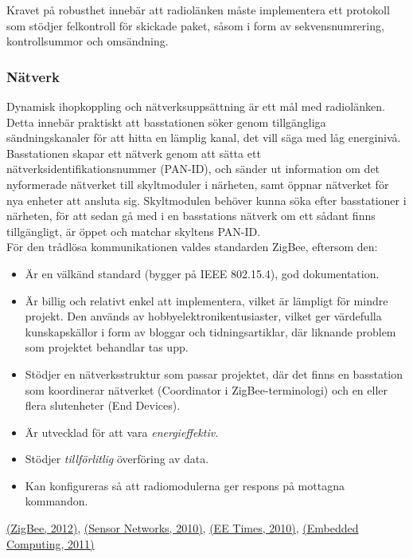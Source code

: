 \documentclass[a4paper,11pt]{article}
\begin{document}
Kravet på robusthet innebär att radiolänken måste implementera ett protokoll som stödjer felkontroll för skickade paket, såsom i form av sekvensnumrering, kontrollsummor och omsändning.

\subsubsection{Nätverk}
Dynamisk ihopkoppling och nätverksuppsättning är ett mål med radiolänken. Detta innebär praktiskt att basstationen söker genom tillgängliga sändningskanaler för att hitta en lämplig kanal, det vill säga med låg energinivå. Basstationen skapar ett nätverk genom att sätta ett nätverksidentifikationsnummer (PAN-ID), och sänder ut information om det nyformerade nätverket till skyltmoduler i närheten, samt öppnar nätverket för nya enheter att ansluta sig. Skyltmodulen behöver kunna söka efter basstationer i närheten, för att sedan gå med i en basstations nätverk om ett sådant finns tillgängligt, är öppet och matchar skyltens PAN-ID. \\

För den trådlösa kommunikationen valdes standarden ZigBee, eftersom den:
	
	\begin{itemize}
    	\item Är en välkänd standard (bygger på IEEE 802.15.4), god dokumentation.
    	\item Är billig och relativt enkel att implementera, vilket är lämpligt för mindre projekt. Den används av hobbyelektronikentusiaster, vilket ger värdefulla kunskapskällor i form av bloggar och tidningsartiklar, där liknande problem som projektet behandlar tas upp.
    	\item Stödjer en nätverksstruktur som passar projektet, där det finns en basstation som koordinerar nätverket (Coordinator i ZigBee-terminologi) och en eller flera slutenheter (End Devices).
    	\item Är utvecklad för att vara {\it energieffektiv}.
    	\item Stödjer {\it tillförlitlig} överföring av data.
    	\item Kan konfigureras så att radiomodulerna ger respons på mottagna kommandon.
    	\end{itemize}
\hyperref[zigbee]{(ZigBee, 2012)}, \hyperref[sensornetworks]{(Sensor Networks, 2010)}, \hyperref[eetimes]{(EE Times, 2010)}, \hyperref[embedded]{(Embedded Computing, 2011)}\\
    	
\end{document}
